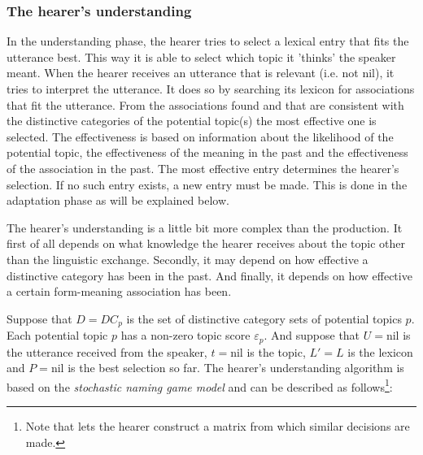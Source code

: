 
\subsubsection{The hearer's understanding}\label{s:cm:understanding}

In the understanding phase, the hearer tries to select a lexical entry that fits the utterance best. This way it is able to select which topic it 'thinks' the speaker meant. When the hearer receives an utterance that is relevant (i.e. not nil), it tries to interpret the utterance. It does so by searching its lexicon for associations that fit the utterance. From the associations found and that are consistent with the distinctive categories of the potential topic(s) the most effective one is selected. The effectiveness is based on information about the likelihood of the potential topic, the effectiveness of the meaning in the past and the effectiveness of the association in the past. The most effective entry determines the hearer's selection. If no such entry exists, a new entry must be made. This is done in the adaptation phase as will be explained below.

The hearer's understanding is a little bit more complex than the production. It first of all depends on what knowledge the hearer receives about the topic other than the linguistic exchange. Secondly, it may depend on how effective a distinctive category has been in the past. And finally, it depends on how effective a certain form-meaning association has been. 


Suppose that $D={DC_p}$ is the set of distinctive category sets of potential topics $p$. Each potential topic $p$ has a non-zero topic score $\varepsilon_p$. And suppose that $U=\mbox{nil}$ is the utterance received from the speaker, $t=\mbox{nil}$ is the topic, $L'=L$ is the lexicon and $P=\mbox{nil}$ is the best selection so far. The hearer's understanding algorithm is based on the {\em stochastic naming game model} \citep{steelskaplan:1998} and can be described as follows\footnote{Note that \citet{steelskaplan:1998} lets the hearer construct a matrix from which similar decisions are made.}:

